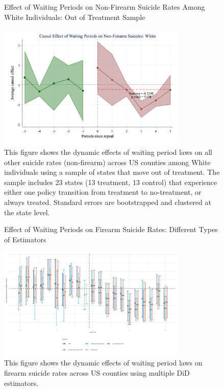 \begin{figure}[htbp]
    \centering
    \caption{Effect of Waiting Periods on Non-Firearm Suicide Rates Among White Individuals: Out of Treatment Sample}
    \label{fig:firearm_suicide_DID_other_white-out}
    \includegraphics[width=0.8\textwidth]{figures/1015-csid-outsample-white-other.png}
    \begin{minipage}{\linewidth}
    \caption*{\footnotesize{
    This figure shows the dynamic effects of waiting period laws on all other suicide rates (non-firearm) across US counties among White individuals using a sample of states that move out of treatment. The sample includes 23 states (13 treatment, 13 control) that experience either one policy transition from treatment to no-treatment, or always treated. Standard errors are bootstrapped and clustered at the state level. }}
  \end{minipage}
\end{figure}

\pagebreak
\clearpage

\begin{figure}[htbp]
    \centering
    \caption{Effect of Waiting Periods on Firearm Suicide Rates: Different Types of Estimators}
    \label{fig:1033-all-estimators}
    \includegraphics[width=0.8\textwidth]{figures/1033-all-estimators.png}
    \begin{minipage}{\linewidth}
    \caption*{\footnotesize{
    This figure shows the dynamic effects of waiting period laws on firearm suicide rates across US counties using multiple DiD estimators.}}
  \end{minipage}
\end{figure}


